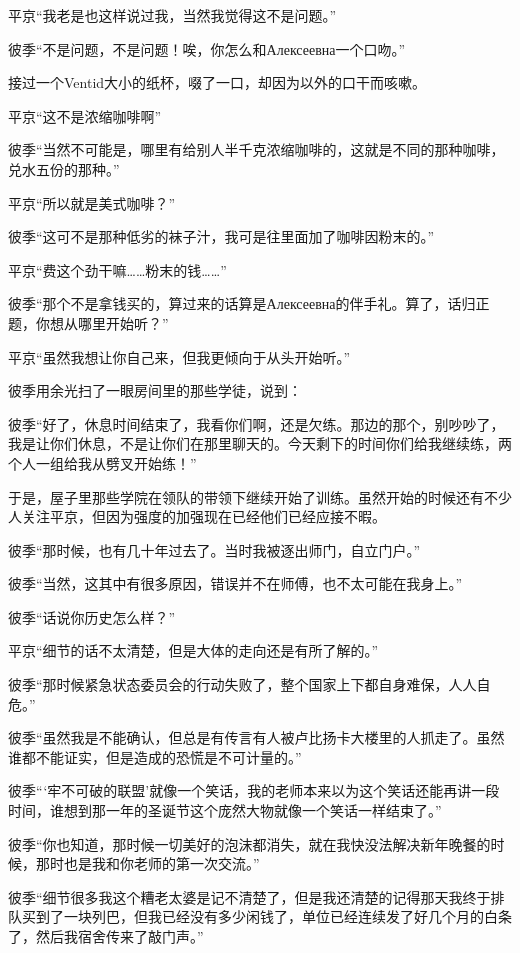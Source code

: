 \documentclass{article}
\begin{document}
平京“我老是也这样说过我，当然我觉得这不是问题。”

彼季“不是问题，不是问题！唉，你怎么和Алексеевна一个口吻。”

接过一个Ventid大小的纸杯，啜了一口，却因为以外的口干而咳嗽。

平京“这不是浓缩咖啡啊”

彼季“当然不可能是，哪里有给别人半千克浓缩咖啡的，这就是不同的那种咖啡，兑水五份的那种。”

平京“所以就是美式咖啡？”

彼季“这可不是那种低劣的袜子汁，我可是往里面加了咖啡因粉末的。”

平京“费这个劲干嘛……粉末的钱……”

彼季“那个不是拿钱买的，算过来的话算是Алексеевна的伴手礼。算了，话归正题，你想从哪里开始听？”

平京“虽然我想让你自己来，但我更倾向于从头开始听。”

彼季用余光扫了一眼房间里的那些学徒，说到：

彼季“好了，休息时间结束了，我看你们啊，还是欠练。那边的那个，别吵吵了，我是让你们休息，不是让你们在那里聊天的。今天剩下的时间你们给我继续练，两个人一组给我从劈叉开始练！”

于是，屋子里那些学院在领队的带领下继续开始了训练。虽然开始的时候还有不少人关注平京，但因为强度的加强现在已经他们已经应接不暇。

彼季“那时候，也有几十年过去了。当时我被逐出师门，自立门户。”

彼季“当然，这其中有很多原因，错误并不在师傅，也不太可能在我身上。”

彼季“话说你历史怎么样？”

平京“细节的话不太清楚，但是大体的走向还是有所了解的。”

彼季“那时候紧急状态委员会的行动失败了，整个国家上下都自身难保，人人自危。”

彼季“虽然我是不能确认，但总是有传言有人被卢比扬卡大楼里的人抓走了。虽然谁都不能证实，但是造成的恐慌是不可计量的。”

彼季“‘牢不可破的联盟’就像一个笑话，我的老师本来以为这个笑话还能再讲一段时间，谁想到那一年的圣诞节这个庞然大物就像一个笑话一样结束了。”

彼季“你也知道，那时候一切美好的泡沫都消失，就在我快没法解决新年晚餐的时候，那时也是我和你老师的第一次交流。”

彼季“细节很多我这个糟老太婆是记不清楚了，但是我还清楚的记得那天我终于排队买到了一块列巴，但我已经没有多少闲钱了，单位已经连续发了好几个月的白条了，然后我宿舍传来了敲门声。”
\end{document}
